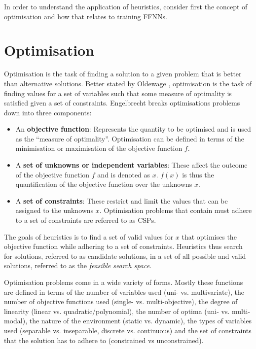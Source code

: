 In order to understand the application of heuristics, consider first the concept of optimisation and how that relates to training \acp{FFNN}.

\section{Optimisation}
\label{sec:heuristics:optimisation}

Optimisation is the task of finding a solution to a given problem that is better than alternative solutions. Better stated by Oldewage \cite{ref:oldewage:2017}, optimisation is the task of finding values for a set of variables such that some measure of optimality is satisfied given a set of constraints. Engelbrecht \cite{ref:engelbrecht:2007} breaks optimisations problems down into three components:

\begin{itemize}
      \item An \textbf{objective function}: Represents the quantity to be optimised and is used as the ``measure of optimality''. Optimisation can be defined in terms of the minimisation or maximisation of the objective function $f$.

      \item A \textbf{set of unknowns or independent variables}: These affect the outcome of the objective function $f$ and is denoted as $x$. $f(x)$ is thus the quantification of the objective function over the unknowns $x$.

      \item A \textbf{set of constraints}: These restrict and limit the values that can be assigned to the unknowns $x$. Optimisation problems that contain must adhere to a set of constraints are referred to as \acp{CSP}.
\end{itemize}

The goals of heuristics is to find a set of valid values for $x$ that optimises the objective function while adhering to a set of constraints. Heuristics thus search for solutions, referred to as candidate solutions, in a set of all possible and valid solutions, referred to as the \textit{feasible search space}.

Optimisation problems come in a wide variety of forms. Mostly these functions are defined in terms of the number of variables used (uni- vs. multivariate), the number of objective functions used (single- vs. multi-objective), the degree of linearity (linear vs. quadratic/polynomial), the number of optima (uni- vs. multi-modal), the nature of the environment (static vs. dynamic), the types of variables used (separable vs. inseparable, discrete vs. continuous) and  the set of constraints that the solution has to adhere to (constrained vs unconstrained).

